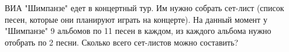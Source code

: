 \question
ВИА "Шимпанзе" едет в концертный тур. Им нужно собрать сет-лист (список песен, которые они планируют играть на концерте). На данный момент у "Шимпанзе" 9 альбомов по 11 песен в каждом, из каждого альбома нужно отобрать по 2 песни. Сколько всего сет-листов можно составить?
